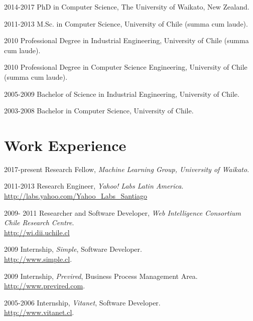 \documentclass[letterpaper]{article}
\begin{document}
\begin{CV}


\item[2014-2017] PhD in Computer Science, The University of Waikato, New Zealand.

\item[2011-2013] M.Sc. in Computer Science, University of Chile (summa cum laude).

\item[2010] Professional Degree in Industrial Engineering, University of Chile (summa cum laude).

\item[2010] Professional Degree in Computer Science Engineering, University of Chile (summa cum laude).

\item[2005-2009]  Bachelor of Science in Industrial Engineering, University of Chile.

\item[2003-2008]  Bachelor in Computer Science, University of Chile.



\end{CV}




\section{Work Experience}

\begin{CV}
\item[2017-present] Research Fellow, \textit{Machine Learning Group, University of Waikato}. \\
\item[2011-2013] Research Engineer, \textit{Yahoo! Labs Latin America}. \\ \url{http://labs.yahoo.com/Yahoo_Labs_Santiago} 
\item[2009- 2011] Researcher and Software Developer, \textit{Web Intelligence Consortium Chile Research Centre}.    \\ \url{http://wi.dii.uchile.cl}
\item[2009] Internship, \textit{Simple}, Software Developer. \\ \url{http://www.simple.cl}.
\item[2009] Internship, \textit{Previred}, Business Process Management Area. \\ \url{http://www.previred.com}.
\item[2005-2006] Internship, \textit{Vitanet}, Software Developer. \\ \url{http://www.vitanet.cl}. 

\end{CV}
\end{document}
